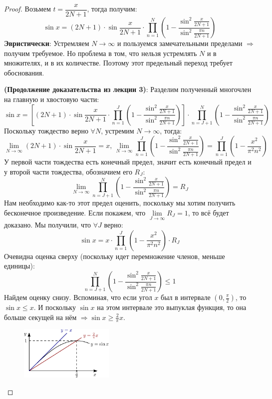\documentclass[12pt]{article}
\theoremstyle{definition}
\begin{document}
\begin{proof}
	Возьмем $t = \dfrac{x}{2N+1}$, тогда получим:
	$$
		\sin x = (2N + 1){\cdot}\sin{ \dfrac{x}{2N+1}}{\cdot} \prod\limits_{n = 1}^N \left(1 - \dfrac{\sin^2 \tfrac{x}{2N + 1}}{\sin^2 \tfrac{\pi n}{2N +1}}\right)
	$$
	\textbf{Эвристически}: Устремляем $N \to \infty$ и пользуемся замечательными пределами $\Rightarrow$ получим требуемое. Но проблема в том, что нельзя устремлять $N$ и в множителях, и в их количестве. Поэтому этот предельный переход требует обоснования.
	
	\textbf{(Продолжение доказательства из лекции 3)}: 
	Разделим полученный многочлен на главную и хвостовую части:
	$$
		\sin{x} = \left[(2N + 1){\cdot}\sin{ \dfrac{x}{2N+1}}{\cdot} \prod\limits_{n = 1}^J \left(1 - \dfrac{\sin^2 \tfrac{x}{2N + 1}}{\sin^2 \tfrac{\pi n}{2N +1}}\right)
		\right]
		{\cdot}
		\prod\limits_{n = J + 1}^N \left(1 - \dfrac{\sin^2 \tfrac{x}{2N + 1}}{\sin^2 \tfrac{\pi n}{2N +1}}\right)
	$$
	Поскольку тождество верно $\forall N$, устремим $N \to \infty$, тогда:
	$$
		\lim\limits_{N \to \infty} (2N + 1){\cdot}\sin{ \dfrac{x}{2N+1}} = x, \, \lim\limits_{N \to \infty}\prod\limits_{n = 1}^J \left(1 - \dfrac{\sin^2 \tfrac{x}{2N + 1}}{\sin^2 \tfrac{\pi n}{2N +1}}\right) = \prod\limits_{n = 1}^J\left(1 - \dfrac{x^2}{\pi^2 n^2}\right)
	$$
	У первой части тождества есть конечный предел, значит есть конечный предел и у второй части тождества, обозначием его $R_J$:
	$$
		\lim\limits_{N \to \infty} \prod\limits_{n = J + 1}^N \left(1 - \dfrac{\sin^2 \tfrac{x}{2N + 1}}{\sin^2 \tfrac{\pi n}{2N +1}}\right) = R_J
	$$
	Нам необходимо как-то этот предел оценить, поскольку мы хотим получить бесконечное произведение. Если покажем, что $\lim\limits_{J \to \infty} R_J = 1$, то всё будет доказано. Мы получили, что $\forall J$ верно:
	$$
		\sin{x} = x{\cdot}\prod\limits_{n = 1}^J\left(1 - \dfrac{x^2}{\pi^2 n^2}\right){\cdot}R_J
	$$
	Очевидна оценка сверху (поскольку идет перемножение членов, меньше единицы):
	$$
		\prod\limits_{n = J + 1}^N \left(1 - \dfrac{\sin^2 \tfrac{x}{2N + 1}}{\sin^2 \tfrac{\pi n}{2N +1}}\right) \leq 1
	$$
	Найдем оценку снизу. Вспоминая, что если угол $x$ был в интервале $\left(0, \tfrac{\pi}{2}\right)$, то $\sin{x} \leq x$. И поскольку $\sin{x}$ на этом интервале это выпуклая функция, то она больше секущей на нём $\Rightarrow \sin{x} \geq \tfrac{2}{\pi}x$.
	\begin{figure}[H]
		\centering
		\includegraphics[width=0.4\textwidth]{MA3_2_1.eps}

\end{figure}
\end{proof}
\end{document}
